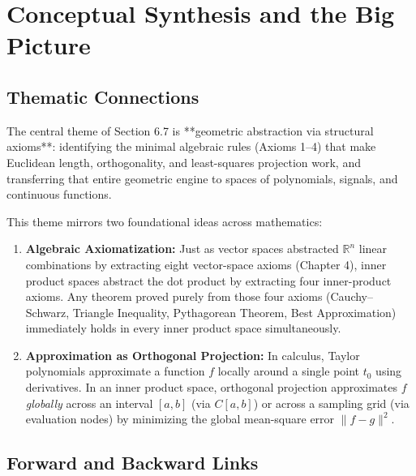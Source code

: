\documentclass[11pt, letterpaper]{article}
\theoremstyle{definition}
\theoremstyle{remark}
\begin{document}
\newpage
\section{Conceptual Synthesis and the Big Picture}

\subsection{Thematic Connections}

The central theme of Section 6.7 is **geometric abstraction via structural axioms**: identifying the minimal algebraic rules (Axioms 1--4) that make Euclidean length, orthogonality, and least-squares projection work, and transferring that entire geometric engine to spaces of polynomials, signals, and continuous functions.

This theme mirrors two foundational ideas across mathematics:
\begin{enumerate}
    \item \textbf{Algebraic Axiomatization:} Just as vector spaces abstracted $\mathbb{R}^n$ linear combinations by extracting eight vector-space axioms (Chapter 4), inner product spaces abstract the dot product by extracting four inner-product axioms. Any theorem proved purely from those four axioms (Cauchy--Schwarz, Triangle Inequality, Pythagorean Theorem, Best Approximation) immediately holds in every inner product space simultaneously.
    \item \textbf{Approximation as Orthogonal Projection:} In calculus, Taylor polynomials approximate a function $f$ locally around a single point $t_0$ using derivatives. In an inner product space, orthogonal projection approximates $f$ \emph{globally} across an interval $[a, b]$ (via $C[a, b]$) or across a sampling grid (via evaluation nodes) by minimizing the global mean-square error $\|f - g\|^2$.
\end{enumerate}

\subsection{Forward and Backward Links}
\end{document}
